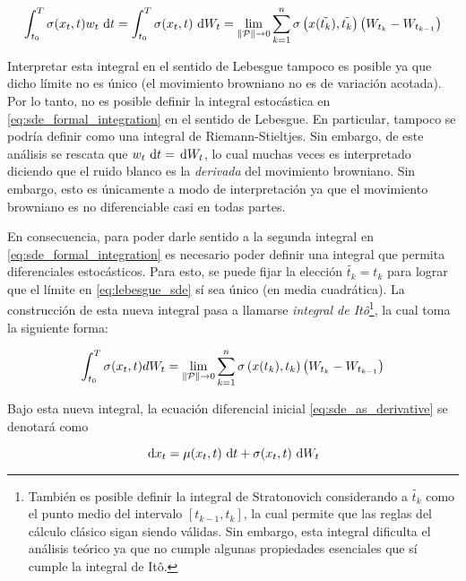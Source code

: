 \begin{equation}
    \label{eq:lebesgue_sde}
    \int_{t_0}^T \sigma(x_t,t)w_t \,\operatorname{d}\! t = \int_{t_0}^T \sigma(x_t,t) \,\operatorname{d}\! W_t = \lim_{\left\lVert \mathcal{P} \right\rVert\to 0} \sum_{k=1}^n \sigma\left(x(\tilde{t_k}),\tilde{t_k}\right) \left(W_{t_k} - W_{t_{k-1}}\right)
\end{equation}

Interpretar esta integral en el sentido de Lebesgue tampoco es posible ya que dicho límite no es único (el movimiento browniano no es de variación acotada). Por lo tanto, no es posible definir la integral estocástica en \eqref{eq:sde_formal_integration} en el sentido de Lebesgue. En particular, tampoco se podría definir como una integral de Riemann-Stieltjes. Sin embargo, de este análisis se rescata que $w_t \,\operatorname{d}\! t = \,\operatorname{d}\! W_t$, lo cual muchas veces es interpretado diciendo que el ruido blanco es la \textit{derivada} del movimiento browniano. Sin embargo, esto es únicamente a modo de interpretación ya que el movimiento browniano es no diferenciable casi en todas partes.

En consecuencia, para poder darle sentido a la segunda integral en \eqref{eq:sde_formal_integration} es necesario poder definir una integral que permita diferenciales estocásticos. Para esto, se puede fijar la elección $\tilde{t_k} = t_k$ para lograr que el límite en \eqref{eq:lebesgue_sde} sí sea único (en media cuadrática). La construcción de esta nueva integral pasa a llamarse \textit{integral de Itô}\footnote{También es posible definir la integral de Stratonovich considerando a $\tilde{t_k}$ como el punto medio del intervalo $[t_{k-1}, t_k]$, la cual permite que las reglas del cálculo clásico sigan siendo válidas. Sin embargo, esta integral dificulta el análisis teórico ya que no cumple algunas propiedades esenciales que sí cumple la integral de Itô.}, la cual toma la siguiente forma:

\begin{equation*}
    \int_{t_0}^T \sigma(x_t,t) dW_t = \lim_{\left\lVert \mathcal{P} \right\rVert\to 0} \sum_{k=1}^n \sigma\left(x(t_k),t_k\right) \left(W_{t_k} - W_{t_{k-1}}\right)
\end{equation*}

Bajo esta nueva integral, la ecuación diferencial inicial \eqref{eq:sde_as_derivative} se denotará como

\begin{equation}
    \label{eq:sde}
    \,\operatorname{d}\! x_t = \mu(x_t,t)\,\operatorname{d}\! t + \sigma(x_t,t)\,\operatorname{d}\! W_t
\end{equation}

